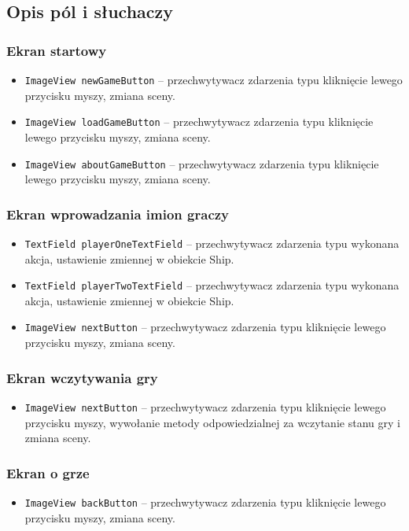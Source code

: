 \documentclass[a4paper]{article}
\newcommand{\prog}{\texttt}
\begin{document}
\subsection{Opis pól i słuchaczy}
\subsubsection{Ekran startowy}
\begin{itemize}
    \item \prog{ImageView newGameButton} -- przechwytywacz zdarzenia typu kliknięcie lewego przycisku myszy, zmiana sceny.
    \item \prog{ImageView loadGameButton} -- przechwytywacz zdarzenia typu kliknięcie lewego przycisku myszy, zmiana sceny.
    \item \prog{ImageView aboutGameButton} -- przechwytywacz zdarzenia typu kliknięcie lewego przycisku myszy, zmiana sceny.
\end{itemize}

\subsubsection{Ekran wprowadzania imion graczy}
\begin{itemize}
    \item \prog{TextField playerOneTextField} -- przechwytywacz zdarzenia typu wykonana akcja, ustawienie zmiennej w obiekcie Ship.
    \item \prog{TextField playerTwoTextField} -- przechwytywacz zdarzenia typu wykonana akcja, ustawienie zmiennej w obiekcie Ship.
    \item \prog{ImageView nextButton} -- przechwytywacz zdarzenia typu kliknięcie lewego przycisku myszy, zmiana sceny.
\end{itemize}

\subsubsection{Ekran wczytywania gry}
\begin{itemize}
    \item \prog{ImageView nextButton} -- przechwytywacz zdarzenia typu kliknięcie lewego przycisku myszy, wywołanie metody odpowiedzialnej za wczytanie stanu gry i zmiana sceny.
\end{itemize}

\subsubsection{Ekran o grze}
\begin{itemize}
    \item \prog{ImageView backButton} -- przechwytywacz zdarzenia typu kliknięcie lewego przycisku myszy, zmiana sceny.
\end{itemize}
\end{document}

